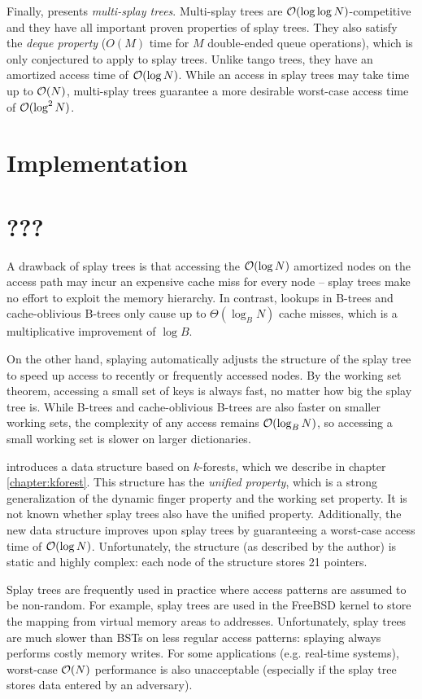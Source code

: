 Finally, \cite{multisplay-trees} presents \emph{multi-splay trees}.
Multi-splay trees are $\mathcal{O}(\log\log N)$-competitive and they have all important
proven properties of splay trees. They also satisfy the \emph{deque property}
($O(M)$ time for $M$ double-ended queue operations), which is only conjectured
to apply to splay trees.
Unlike tango trees, they have an amortized access time of $\mathcal{O}(\log N)$.
While an access in splay trees may take time up to $\mathcal{O}(N)$, multi-splay trees
guarantee a more desirable worst-case access time of $\mathcal{O}(\log^2 N)$.
\section{Implementation}

\section{???}
A drawback of splay trees is that accessing the $\mathcal{O}(\log N)$ amortized
nodes on the access path may incur an expensive cache miss for every node --
splay trees make no effort to exploit the memory hierarchy.
In contrast, lookups in B-trees and cache-oblivious B-trees
only cause up to $\Theta(\log_B N)$ cache misses, which is a multiplicative
improvement of $\log B$.

On the other hand, splaying automatically adjusts the structure of the splay
tree to speed up access to recently or frequently accessed nodes. By the
working set theorem, accessing a small set of keys is always fast, no matter
how big the splay tree is. While B-trees and cache-oblivious B-trees are
also faster on smaller working sets, the complexity of any access remains
$\mathcal{O}(\log_B N)$, so accessing a small working set is slower on larger
dictionaries.

\cite{alternatives-to-splay-trees} introduces a data structure based
on $k$-forests, which we describe in chapter \ref{chapter:kforest}.
This structure has the \emph{unified property}, which is a strong
generalization of the dynamic finger property and the working set property.
It is not known whether splay trees also have the unified property.
Additionally, the new data structure improves upon splay trees by guaranteeing
a worst-case access time of $\mathcal{O}(\log N)$. Unfortunately, the structure
(as described by the author) is static and highly complex: each node of
the structure stores 21 pointers.

Splay trees are frequently used in practice where access patterns are assumed
to be non-random. For example, splay trees are used in the FreeBSD kernel
to store the mapping from virtual memory areas to
addresses\cite{freebsd-vm-splay}. %
Unfortunately, splay trees are much slower than BSTs on less
regular access patterns: splaying always performs costly memory writes.
For some applications (e.g. real-time systems), worst-case $\mathcal{O}(N)$ performance
is also unacceptable (especially if the splay tree stores data entered by
an adversary).
